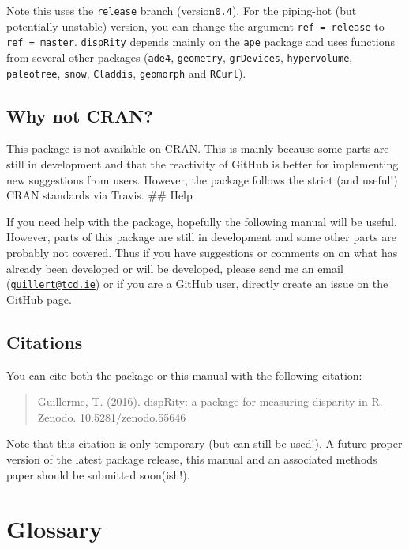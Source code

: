 \documentclass[]{book}
\theoremstyle{definition}
\theoremstyle{definition}
\theoremstyle{remark}
\begin{document}
Note this uses the \texttt{release} branch (version\texttt{0.4}). For
the piping-hot (but potentially unstable) version, you can change the
argument \texttt{ref\ =\ release} to \texttt{ref\ =\ master}.
\texttt{dispRity} depends mainly on the \texttt{ape} package and uses
functions from several other packages (\texttt{ade4}, \texttt{geometry},
\texttt{grDevices}, \texttt{hypervolume}, \texttt{paleotree},
\texttt{snow}, \texttt{Claddis}, \texttt{geomorph} and \texttt{RCurl}).

\section{Why not CRAN?}\label{why-not-cran}

This package is not available on CRAN. This is mainly because some parts
are still in development and that the reactivity of GitHub is better for
implementing new suggestions from users. However, the package follows
the strict (and useful!) CRAN standards via Travis. \#\# Help

If you need help with the package, hopefully the following manual will
be useful. However, parts of this package are still in development and
some other parts are probably not covered. Thus if you have suggestions
or comments on on what has already been developed or will be developed,
please send me an email
(\href{mailto:guillert@tcd.ie}{\nolinkurl{guillert@tcd.ie}}) or if you
are a GitHub user, directly create an issue on the
\href{https://github.com/TGuillerme/dispRity}{GitHub page}.

\section{Citations}\label{citations}

You can cite both the package or this manual with the following
citation:

\begin{quote}
Guillerme, T. (2016). dispRity: a package for measuring disparity in R.
Zenodo. 10.5281/zenodo.55646
\end{quote}

Note that this citation is only temporary (but can still be used!). A
future proper version of the latest package release, this manual and an
associated methods paper should be submitted soon(ish!).

\chapter{Glossary}\label{glossary}
\end{document}
